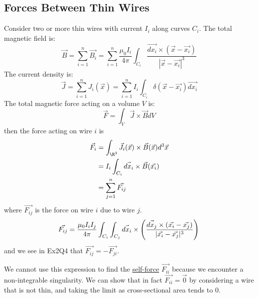 \documentclass[../Main.tex]{subfiles}
\begin{document}
\subsection{Forces Between Thin Wires}
Consider two or more thin wires with current $I_i$ along curves $C_i$. The total magnetic field is:
\begin{equation*}
    \vec{B} = \sum_{i=1}^{n} \vec{B_i} = \sum_{i=1}^{n} \frac{\mu_0I_i}{4\pi} \int_{C_i} \frac{\vec{dx_i} \times (\vec{x} - \vec{x_i})}{|\vec{x} - \vec{x_i}|^3}
\end{equation*}
The current density is:
\begin{equation*}
    \vec{J} = \sum_{i=1}^{n} J_i(\vec{x}) = \sum_{i=1}^{n} I_i \int_{C_i} \delta(\vec{x} - \vec{x_i}) \vec{dx_i}
\end{equation*}
The total magnetic force acting on a volume $V$ is:
\begin{equation*}
    \vec{F} = \int_V \vec{J} \times \vec{B} dV
\end{equation*}
then the force acting on wire $i$ is
\begin{align*}
    \vec{F_i} &= \int_{\R^3} \vec{J_i}(\vec{x}) \times \vec{B}(\vec{x}) d^3\vec{x} \\
    &= I_i \int_{C_i} \vec{dx_i} \times \vec{B}(\vec{x_i}) \\
    &= \sum_{j=1}^{n} \vec{F_{ij}}
\end{align*}
where $\vec{F_{ij}}$ is the force on wire $i$ due to wire $j$.
\begin{equation*}
    \vec{F_{ij}} = \frac{\mu_0 I_i I_j}{4\pi} \int_{C_i} \int_{C_j} \vec{dx_i} \times \left(\frac{\vec{dx_j} \times (\vec{x_i} - \vec{x_j})}{|\vec{x_i} - \vec{x_j}|^3}\right) \\
\end{equation*}
and we see in Ex2Q4 that $\vec{F_{ij}} = -\vec{F_{ji}}$.

We cannot use this expression to find the \underline{self-force} $\vec{F_{ii}}$ because we encounter a non-integrable singularity. We can show that in fact $\vec{F_{ii}} = \vec0$ by considering a wire that is not thin, and taking the limit as cross-sectional area tends to 0.
\end{document}
